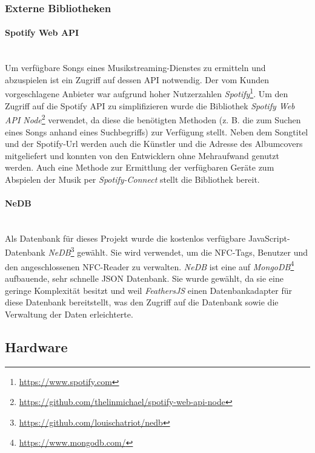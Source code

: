 \documentclass[10pt, a4paper]{article}
\begin{document}
\begin{onehalfspace}
  \subsubsection{Externe Bibliotheken}
  \paragraph{Spotify Web API} $~$ \\
  \label{SpotifyWebApiNode}
  Um verfügbare Songs eines Musikstreaming-Dienstes zu ermitteln und abzuspielen ist ein Zugriff auf dessen API notwendig.
  Der vom Kunden vorgeschlagene Anbieter war aufgrund hoher Nutzerzahlen \textit{Spotify}\footnote{\url{https://www.spotify.com}}.
  Um den Zugriff auf die Spotify API zu simplifizieren wurde die Bibliothek \textit{Spotify Web API Node}\footnote{\url{https://github.com/thelinmichael/spotify-web-api-node}} verwendet, da diese die benötigten Methoden (z. B. die zum Suchen eines Songs anhand eines Suchbegriffs) zur Verfügung stellt.
  Neben dem Songtitel und der Spotify-Url werden auch die Künstler und die Adresse des Albumcovers mitgeliefert und konnten von den Entwicklern ohne Mehraufwand genutzt werden.
  Auch eine Methode zur Ermittlung der verfügbaren Geräte zum Abspielen der Musik per \textit{Spotify-Connect} stellt die Bibliothek bereit.

  \paragraph{NeDB} $~$ \\
  Als Datenbank für dieses Projekt wurde die kostenlos verfügbare JavaScript-Datenbank \textit{NeDB}\footnote{\raggedright\url{https://github.com/louischatriot/nedb}} gewählt.
  Sie wird verwendet, um die NFC-Tags, Benutzer und den angeschlossenen NFC-Reader zu verwalten.
  \textit{NeDB} ist eine auf \textit{MongoDB}\footnote{\raggedright\url{https://www.mongodb.com/}} aufbauende, sehr schnelle JSON Datenbank.
  Sie wurde gewählt, da sie eine geringe Komplexität besitzt und weil \textit{FeathersJS} einen Datenbankadapter für diese Datenbank bereitstellt, was den Zugriff auf die Datenbank sowie die Verwaltung der Daten erleichterte.


  \subsection{Hardware}

\end{onehalfspace}
\end{document}
